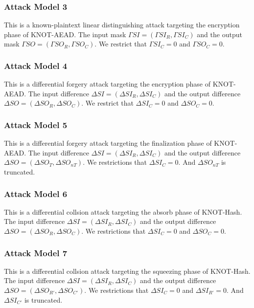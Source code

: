 
\subsubsection{Attack Model 3}
This is a known-plaintext linear distinguishing attack targeting the encryption phase of KNOT-AEAD. The input mask $\Gamma SI=(\Gamma SI_R,\Gamma SI_C)$ and the output mask $\Gamma SO=(\Gamma SO_R,\Gamma SO_C)$. We restrict that $\Gamma SI_C=0$ and $\Gamma SO_C=0$. 


\subsubsection{Attack Model 4}
This is a differential forgery attack targeting the encryption phase of KNOT-AEAD. The input difference $\Delta SI=(\Delta SI_R,\Delta SI_C)$ and the output difference $\Delta SO=(\Delta SO_R,\Delta SO_C)$. We restrict that $\Delta SI_C=0$ and $\Delta SO_C=0$. 

\subsubsection{Attack Model 5}
This is a differential forgery attack targeting the finalization phase of KNOT-AEAD. The input difference $\Delta SI=(\Delta SI_R,\Delta SI_C)$ and the output difference $\Delta SO=(\Delta SO_T,\Delta SO_{nT})$. We restrictions that $\Delta SI_C=0$. And $\Delta SO_{nT}$ is truncated. 



\subsubsection{Attack Model 6}
This is a differential collsion attack targeting the absorb phase of KNOT-Hash. The input difference $\Delta SI=(\Delta SI_R,\Delta SI_C)$ and the output difference $\Delta SO=(\Delta SO_R,\Delta SO_C)$. We restrictions that $\Delta SI_C=0$ and $\Delta SO_C=0$. 

\subsubsection{Attack Model 7}
This is a differential collsion attack targeting the squeezing phase of KNOT-Hash. The input difference $\Delta SI=(\Delta SI_R,\Delta SI_C)$ and the output difference $\Delta SO=(\Delta SO_{R'},\Delta SO_{C'})$. We restrictions that $\Delta SI_C=0$ and $\Delta SI_{R'}=0$. And $\Delta SI_{C'}$ is truncated. 


